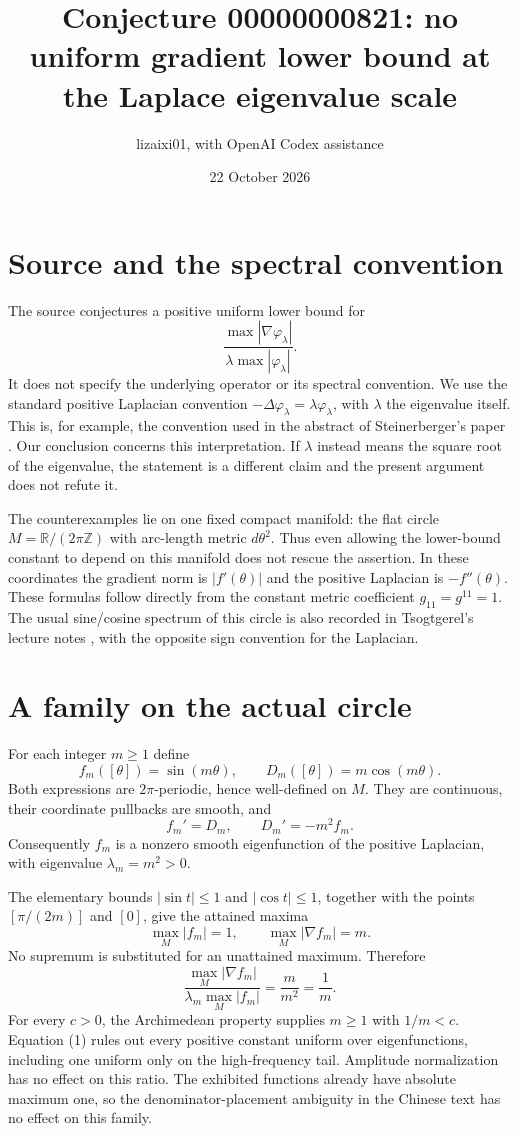 \documentclass[11pt]{article}
\title{Conjecture 00000000821: no uniform gradient lower bound at the Laplace eigenvalue scale}
\author{lizaixi01, with OpenAI Codex assistance}
\date{22 October 2026}
\begin{document}
\maketitle
\section{Source and the spectral convention}
The source conjectures a positive uniform lower bound for
\[
 \frac{\max |\nabla\varphi_\lambda|}
 {\lambda\max|\varphi_\lambda|}.
\]
It does not specify the underlying operator or its spectral convention.
We use the standard positive Laplacian convention
$-\Delta\varphi_\lambda=\lambda\varphi_\lambda$, with
$\lambda$ the eigenvalue itself. This is, for example, the convention used
in the abstract of Steinerberger's paper \cite{steinerberger}.
Our conclusion concerns this interpretation. If $\lambda$ instead means
the square root of the eigenvalue, the statement is a different claim
and the present argument does not refute it.

The counterexamples lie on one fixed compact manifold: the flat circle
$M=\mathbb R/(2\pi\mathbb Z)$ with arc-length metric $d\theta^2$.
Thus even allowing the lower-bound constant to depend on this manifold
does not rescue the assertion. In these coordinates the gradient norm is
$|f'(\theta)|$ and the positive Laplacian is $-f''(\theta)$.
These formulas follow directly from the constant metric coefficient
$g_{11}=g^{11}=1$. The usual sine/cosine spectrum of this circle is also
recorded in Tsogtgerel's lecture notes \cite{tsogtgerel}, with the opposite
sign convention for the Laplacian.

\section{A family on the actual circle}
For each integer $m\geq1$ define
\[
 f_m([\theta])=\sin(m\theta),\qquad
 D_m([\theta])=m\cos(m\theta).
\]
Both expressions are $2\pi$-periodic, hence well-defined on $M$.
They are continuous, their coordinate pullbacks are smooth, and
\[
 f_m'=D_m,\qquad D_m'=-m^2f_m.
\]
Consequently $f_m$ is a nonzero smooth eigenfunction of the positive
Laplacian, with eigenvalue $\lambda_m=m^2>0$.

The elementary bounds $|\sin t|\leq1$ and $|\cos t|\leq1$, together with
the points $[\pi/(2m)]$ and $[0]$, give the attained maxima
\[
 \max_M|f_m|=1,\qquad \max_M|\nabla f_m|=m.
\]
No supremum is substituted for an unattained maximum. Therefore
\[
 \frac{\max_M|\nabla f_m|}{\lambda_m\max_M|f_m|}
 =\frac{m}{m^2}=\frac1m.                         \tag{1}
\]
For every $c>0$, the Archimedean property supplies $m\geq1$ with $1/m<c$.
Equation (1) rules out every positive constant uniform over eigenfunctions,
including one uniform only on the high-frequency tail. Amplitude
normalization has no effect on this ratio. The exhibited functions already
have absolute maximum one, so the denominator-placement ambiguity in the
Chinese text has no effect on this family.
\end{document}
